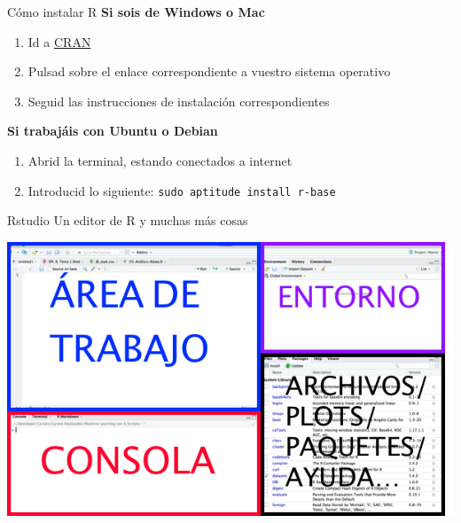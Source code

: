 \documentclass[
  ignorenonframetext,
  aspectratio=169]{beamer}
\providecommand{\tightlist}{%
  \setlength{\itemsep}{0pt}\setlength{\parskip}{0pt}}
\begin{document}
\begin{frame}[fragile]{Cómo instalar R}
\label{cuxf3mo-instalar-r}
\textbf{Si sois de Windows o Mac}

\begin{enumerate}
\tightlist
\item
  Id a \href{http://cran.r-project.org/}{CRAN}
\item
  Pulsad sobre el enlace correspondiente a vuestro sistema operativo
\item
  Seguid las instrucciones de instalación correspondientes
\end{enumerate}

\textbf{Si trabajáis con Ubuntu o Debian}

\begin{enumerate}
\tightlist
\item
  Abrid la terminal, estando conectados a internet
\item
  Introducid lo siguiente: \texttt{sudo\ aptitude\ install\ r-base}
\end{enumerate}
\end{frame}

\begin{frame}{Rstudio}
\label{rstudio}
Un editor de R y muchas más cosas

\begin{center}\includegraphics[width=0.55\linewidth]{Imgs/InterfazRStudio} \end{center}
\end{frame}
\end{document}

